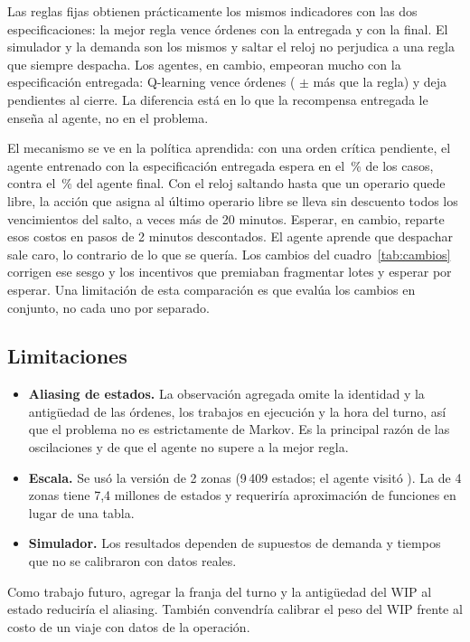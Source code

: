 \documentclass[11pt,letterpaper]{article}
\begin{document}
Las reglas fijas obtienen prácticamente los mismos indicadores con las dos especificaciones: la mejor
regla vence \EUrgV{} órdenes con la entregada y \UrgV{} con la final. El simulador y la demanda son los
mismos y saltar el reloj no perjudica a una regla que siempre despacha. Los agentes, en cambio, empeoran
mucho con la especificación entregada: Q-learning vence \EQLV{} órdenes (\DifEQLV{} $\pm$ \DifEQLVci{} más
que la regla) y deja \EQLP{} pendientes al cierre. La diferencia está en lo que la recompensa entregada
le enseña al agente, no en el problema.

El mecanismo se ve en la política aprendida: con una orden crítica pendiente, el agente entrenado con la
especificación entregada espera en el \PolESesperar\,\% de los casos, contra el \PolSesperar\,\% del agente
final. Con el reloj saltando hasta que un operario quede libre, la acción que asigna al último operario
libre se lleva sin descuento todos los vencimientos del salto, a veces más de 20 minutos. Esperar, en
cambio, reparte esos costos en pasos de 2 minutos descontados. El agente aprende que despachar sale caro,
lo contrario de lo que se quería. Los cambios del cuadro~\ref{tab:cambios} corrigen ese sesgo y los
incentivos que premiaban fragmentar lotes y esperar por esperar. Una limitación de esta comparación es que
evalúa los cambios en conjunto, no cada uno por separado.

\subsection{Limitaciones}

\begin{itemize}
  \item \textbf{Aliasing de estados.} La observación agregada omite la identidad y la antigüedad de las
    órdenes, los trabajos en ejecución y la hora del turno, así que el problema no es estrictamente de Markov.
    Es la principal razón de las oscilaciones y de que el agente no supere a la mejor regla.
  \item \textbf{Escala.} Se usó la versión de 2 zonas (9\,409 estados; el agente visitó \QLEstados{}). La de
    4 zonas tiene 7,4 millones de estados y requeriría aproximación de funciones en lugar de una tabla.
  \item \textbf{Simulador.} Los resultados dependen de supuestos de demanda y tiempos que no se calibraron
    con datos reales.
\end{itemize}

Como trabajo futuro, agregar la franja del turno y la antigüedad del WIP al estado reduciría el aliasing.
También convendría calibrar el peso del WIP frente al costo de un viaje con datos de la operación.
\end{document}
